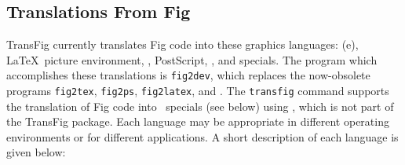 \subsection{Translations From Fig}
TransFig currently translates Fig code into these graphics languages:
	{\sc (e)}\EPIC, \LaTeX\  picture environment, \PicTeX, PostScript, 
	\PIC, and \textyl specials.
The program which accomplishes these translations is {\tt fig2dev},
	which replaces the now-obsolete programs
	{\tt fig2tex}, {\tt fig2ps}, {\tt fig2latex}, and
	.
The {\tt transfig} command supports the translation of Fig code into
	\tpic\ specials (see below) using \tpic,
	which is not part of the TransFig package.
Each language may be appropriate in different operating environments
	or for different applications.
A short description of each language is given below:
%
